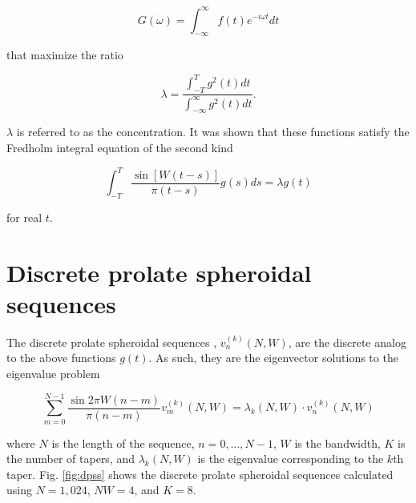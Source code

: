 \documentclass[preprint,12pt]{elsarticle}
\begin{document}
\begin{equation} G(\omega) = \int_{-\infty}^{\infty} f(t) e^{-i\omega t} dt \end{equation}

that maximize the ratio 

\begin{equation} \lambda = \frac{\int_{-T}^{T} g^2(t)dt}{\int_{-\infty}^{\infty} g^2(t)dt}. \end{equation}

$\lambda$ is referred to as the concentration. It was shown that these functions
satisfy the Fredholm integral equation of the second kind

\begin{equation} \int_{-T}^{T} \frac{\sin [W (t - s)]}{\pi (t-s)} g(s)ds = \lambda g(t) \end{equation}

for real $t$. 

\section{Discrete prolate spheroidal sequences}

The discrete prolate spheroidal sequences \cite{S78}, $v_n^{(k)}(N,W)$, are the
discrete analog to the above functions $g(t)$. As such, they are the eigenvector
solutions to the eigenvalue problem

\begin{equation}\label{eq:dpss}
\sum_{m = 0}^{N-1}\frac{\sin 2\pi W(n-m)}{\pi(n-m)}v_m^{(k)}(N,W) = \lambda_k(N,W)\cdot v_n^{(k)}(N,W)
\end{equation}

where $N$ is the length of the sequence, $n = 0, \ldots, N-1$, $W$ is the bandwidth,
$K$ is the number of tapers, and $\lambda_k(N,W)$ is the eigenvalue corresponding to
the $k$th taper. Fig. \ref{fig:dpss} shows the discrete prolate spheroidal sequences
calculated using $N = 1,024$, $NW=4$, and $K=8$. 
\end{document}
